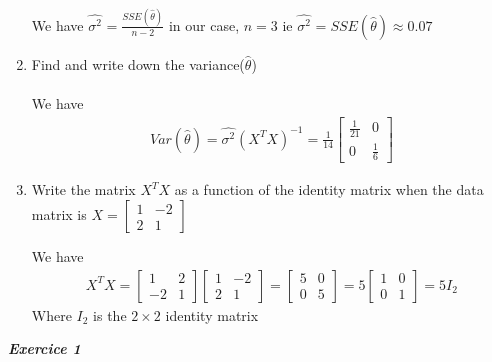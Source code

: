\documentclass[12pt,a4paper]{article}
\begin{document}
\begin{enumerate}
\\ We have $\hat{\sigma^{2}}^{} = \frac{SSE(\hat{\theta})}{n-2}$ in our case, $n=3$ ie $\hat{\sigma^{2}}^{} = SSE(\hat{\theta})\approx 0.07$
\item Find and write down the variance($\hat{\theta}$)\\
\\We have \begin{align}
	Var(\hat{\theta}) = \hat{\sigma^{2}}^{}(X^{T}X)^{-1}=\frac{1}{14}\begin{bmatrix}
		\frac{1}{21}&0\\
		0&\frac{1}{6}
	\end{bmatrix}
\end{align}
\item Write the matrix $X^{T}X$ as a function of the identity matrix when the data matrix is $X=\begin{bmatrix}
	1&-2\\
	2&1
\end{bmatrix}$

We have \begin{align}
	X^{T}X = \begin{bmatrix}
		1&2\\
		-2&1
	\end{bmatrix}\begin{bmatrix}
	1&-2\\
	2&1
\end{bmatrix}=\begin{bmatrix}
5&0\\
0&5
\end{bmatrix}=5\begin{bmatrix}
1&0\\
0&1
\end{bmatrix}=5I_{2}
\end{align}
Where $I_{2}$ is the $2\times2$ identity matrix
\end{enumerate}

\textbf{\textit{Exercice 1}}
\end{document}
